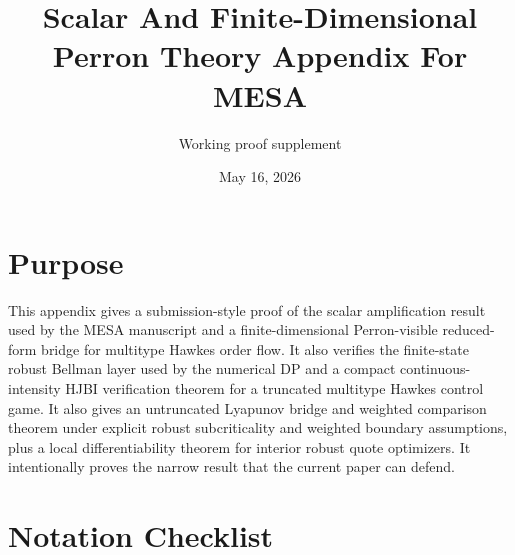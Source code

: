 \documentclass[11pt]{article}
\title{Scalar And Finite-Dimensional Perron Theory Appendix For MESA}
\author{Working proof supplement}
\date{May 16, 2026}
\begin{document}
\maketitle

\section{Purpose}

This appendix gives a submission-style proof of the scalar amplification result
used by the MESA manuscript and a finite-dimensional Perron-visible
reduced-form bridge for multitype Hawkes order flow. It also verifies the
finite-state robust Bellman layer used by the numerical DP and a compact
continuous-intensity HJBI verification theorem for a truncated multitype
Hawkes control game. It also gives an untruncated Lyapunov bridge and weighted
comparison theorem under explicit robust subcriticality and weighted boundary
assumptions, plus a local differentiability theorem for interior robust quote
optimizers. It intentionally proves the narrow result that the current paper
can defend.

\section{Notation Checklist}
\end{document}
